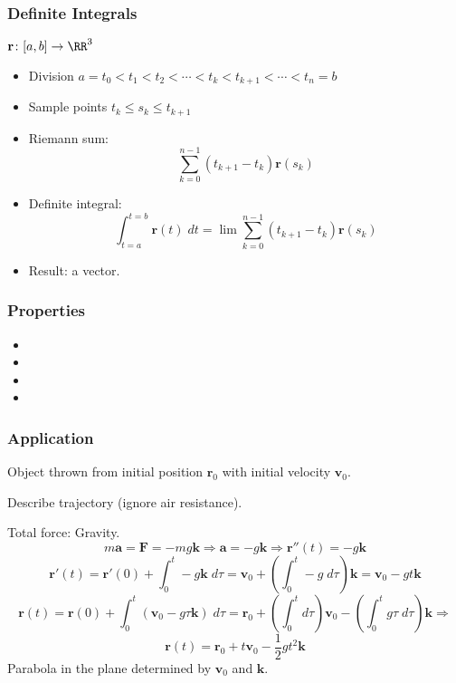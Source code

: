 \begin{frame}
  \frametitle{Definite Integrals}
  $\textbf{r} \colon [a,b] \to \RR^3$

  \begin{itemize}
    \item Division $a =t_0 < t_1 <t_2 < \dotsb < t_k < t_{k+1} < \dotsb < t_n = b$
    \item Sample points $t_k \leqslant s_k \leqslant t_{k+1}$
    \item Riemann sum:
    $$\sum_{k=0}^{n-1} (t_{k+1}-t_k) \textbf{r}(s_k)$$
    \item Definite integral:
    $$\int_{t=a}^{t=b} \textbf{r}(t) \; dt = \lim \sum_{k=0}^{n-1} (t_{k+1}-t_k) \textbf{r}(s_k)$$
    \item Result: \pause a vector.
  \end{itemize}
\end{frame}

\begin{frame}
  \frametitle{Properties}
  \begin{itemize}
    \item{}
    \item{}
    \item{}
    \item{}
  \end{itemize}
\end{frame}

\begin{frame}
  \frametitle{Application}

  Object thrown from initial position $\textbf{r}_0$ with initial velocity $\textbf{v}_0$.

  Describe trajectory (ignore air resistance).\pause

  Total force: Gravity.
%
$$m\textbf{a} = \textbf{F} =  -mg \textbf{k} \Longrightarrow \textbf{a} =
-g \textbf{k} \Longrightarrow \textbf{r}''(t) = -g \textbf{k}$$
\pause
%
$$\textbf{r}'(t) = \textbf{r}'(0) + \int_{0}^t -g \textbf{k} \; d\tau = \textbf{v}_0 + \left(\int_{0}^t -g\; d\tau \right) \textbf{k} = \textbf{v}_0 -gt \textbf{k}$$
%
\pause
$$\textbf{r}(t) = \textbf{r}(0) + \int_{0}^t (\textbf{v}_0-g\tau \textbf{k}) \; d\tau = \textbf{r}_0 + \left( \int_0^t d\tau \right) \textbf{v}_0 - \left( \int_0^t g\tau \; d\tau \right) \textbf{k} \Longrightarrow$$
%
$$\boxed{\textbf{r}(t) = \textbf{r}_0  +t  \textbf{v}_0 - \frac{1}{2}gt^2 \textbf{k}}$$
\pause
Parabola in the plane determined by $\textbf{v}_0$ and $\textbf{k}$.
\end{frame}


